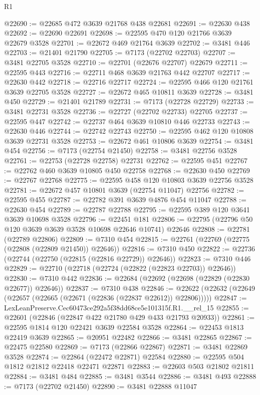 \begin{lexlean}{R1}
\begin{coremodule}
@22690 := @22685 @472 @3639 @21768 @438 @22681
@22691 := @22630 @438
@22692 := @22690 @22691
@22698 := @22595 @470 @120 @21766 @3639 @22679 @3528
@22701 := @22672 @469 @21764 @3639
@22702 := @3481 @446
@22703 := @21401 @21790
@22705 := @7173 (@22702 @22703)
@22707 := @3481 @22705 @3528
@22710 := @22701 (@22676 @22707) @22679
@22711 := @22595 @443
@22716 := @22711 @468 @3639 @21763 @442 @22707
@22717 := @22630 @442
@22718 := @22716 @22717
@22724 := @22595 @466 @120 @21761 @3639 @22705 @3528
@22727 := @22672 @465 @10811 @3639
@22728 := @3481 @450
@22729 := @21401 @21789
@22731 := @7173 (@22728 @22729)
@22733 := @3481 @22731 @3528
@22736 := @22727 (@22702 @22733) @22705
@22737 := @22595 @447
@22742 := @22737 @464 @3639 @10810 @446 @22733
@22743 := @22630 @446
@22744 := @22742 @22743
@22750 := @22595 @462 @120 @10808 @3639 @22731 @3528
@22753 := @22672 @461 @10806 @3639
@22754 := @3481 @454
@22756 := @7173 (@22754 @21450)
@22758 := @3481 @22756 @3528
@22761 := @22753 (@22728 @22758) @22731
@22762 := @22595 @451
@22767 := @22762 @460 @3639 @10805 @450 @22758
@22768 := @22630 @450
@22769 := @22767 @22768
@22775 := @22595 @458 @120 @10803 @3639 @22756 @3528
@22781 := @22672 @457 @10801 @3639 (@22754 @11047) @22756
@22782 := @22595 @455
@22787 := @22782 @391 @3639 @4876 @454 @11047
@22788 := @22630 @454
@22789 := @22787 @22788
@22795 := @22595 @389 @120 @3641 @3639 @10698 @3528
@22796 := @22451 @181
@22806 := @22795 (@22796 @50 @120 @3639 @3639 @3528 @10698 @22646 @10741) @22646
@22808 := @22781 (@22789 @22806)
@22809 := @7310 @454
@22815 := @22761 (@22769 (@22775 (@22808 (@22809 @21450)) @22646))
@22816 := @7310 @450
@22822 := @22736 (@22744 (@22750 (@22815 (@22816 @22729)) @22646))
@22823 := @7310 @446
@22829 := @22710 (@22718 (@22724 (@22822 (@22823 @22703)) @22646))
@22830 := @7310 @442
@22836 := @22684 (@22692 (@22698 (@22829 (@22830 @22677)) @22646))
@22837 := @7310 @438
@22846 := @22622 (@22632 (@22649 (@22657 (@22665 (@22671 (@22836 (@22837 @22612)) @22806)))))
@22847 := LexLeanPreserve.Cec60473ce292a5f38dd68ce5e101315f.R1.__rel_15
@22855 := @22601 (@22846 (@22847 @422 @21780 @429 @433 @21793 @20933))
@22861 := @22595 @1814 @120 @22421 @3639 @22584 @3528
@22864 := @22453 @1813 @22419 @3639
@22865 := @20951 @22482
@22866 := @3481 @22865
@22867 := @22475 @22580
@22869 := @7173 (@22866 @22867)
@22871 := @3481 @22869 @3528
@22874 := @22864 (@22472 @22871) @22584
@22880 := @22595 @504 @1812 @21812 @22418 @22471 @22871
@22883 := @22603 @503 @21802 @21811
@22884 := @3481 @484
@22885 := @3481 @3544
@22886 := @3481 @493
@22888 := @7173 (@22702 @21450)
@22890 := @3481 @22888 @11047

\end{coremodule}
\end{lexlean}
